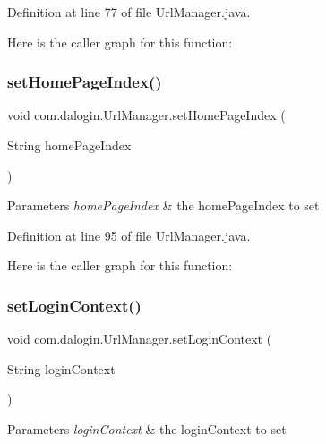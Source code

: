 Definition at line 77 of file Url\+Manager.\+java.

Here is the caller graph for this function\+:
\mbox{\label{classcom_1_1dalogin_1_1_url_manager_a3a19e29c5f0e4952062bdc82ca65d483}} 
\subsubsection{\texorpdfstring{set\+Home\+Page\+Index()}{setHomePageIndex()}}
{\footnotesize\ttfamily void com.\+dalogin.\+Url\+Manager.\+set\+Home\+Page\+Index (\begin{DoxyParamCaption}\item[{String}]{home\+Page\+Index }\end{DoxyParamCaption})}


\begin{DoxyParams}{Parameters}
{\em home\+Page\+Index} & the home\+Page\+Index to set \\
\hline
\end{DoxyParams}


Definition at line 95 of file Url\+Manager.\+java.

Here is the caller graph for this function\+:
\mbox{\label{classcom_1_1dalogin_1_1_url_manager_af86547d3389b02da8115f91cdb02c570}} 
\subsubsection{\texorpdfstring{set\+Login\+Context()}{setLoginContext()}}
{\footnotesize\ttfamily void com.\+dalogin.\+Url\+Manager.\+set\+Login\+Context (\begin{DoxyParamCaption}\item[{String}]{login\+Context }\end{DoxyParamCaption})}


\begin{DoxyParams}{Parameters}
{\em login\+Context} & the login\+Context to set \\
\hline
\end{DoxyParams}


